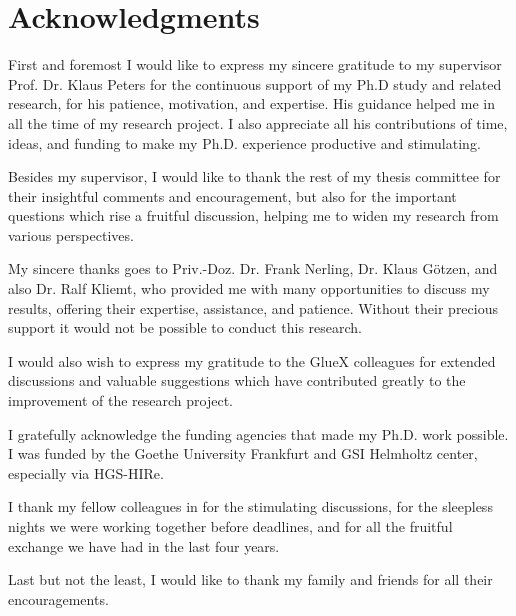 \section*{Acknowledgments}

First and foremost I would like to express my sincere gratitude to my supervisor Prof. Dr. Klaus Peters for the continuous support of my Ph.D study and related research, for his patience, motivation, and expertise. His guidance helped me in all the time of my research project. I also appreciate all his contributions of time, ideas, and funding to make my Ph.D. experience productive and stimulating.
~\par Besides my supervisor, I would like to thank the rest of my thesis committee for their insightful comments and encouragement, but also for the important questions which rise a fruitful discussion, helping me to widen my research from various perspectives.
~\par My sincere thanks goes to Priv.-Doz. Dr. Frank Nerling, Dr. Klaus G\"otzen, and also Dr. Ralf Kliemt, who provided me with many opportunities to discuss my results, offering their expertise, assistance, and patience. Without their precious support it would not be possible to conduct this research.
~\par I would also wish to express my gratitude to the GlueX colleagues for extended discussions and valuable suggestions which have contributed greatly to the improvement of the research project.
~\par I gratefully acknowledge the funding agencies that made my Ph.D. work possible. I was funded by the Goethe University Frankfurt and GSI Helmholtz center, especially via HGS-HIRe.
~\par I thank my fellow colleagues in for the stimulating discussions, for the sleepless nights we were working together before deadlines, and for all the fruitful exchange we have had in the last four years.
~\par Last but not the least, I would like to thank my family and friends for all their encouragements.

